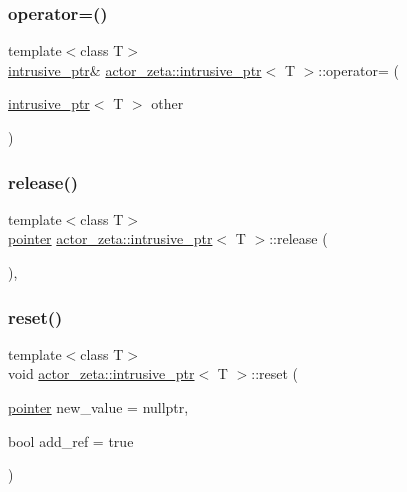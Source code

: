\subsubsection{\texorpdfstring{operator=()}{operator=()}\hspace{0.1cm}{\footnotesize\ttfamily [2/2]}}
{\footnotesize\ttfamily template$<$class T$>$ \\
\hyperlink{classactor__zeta_1_1intrusive__ptr}{intrusive\+\_\+ptr}\& \hyperlink{classactor__zeta_1_1intrusive__ptr}{actor\+\_\+zeta\+::intrusive\+\_\+ptr}$<$ T $>$\+::operator= (\begin{DoxyParamCaption}\item[{\hyperlink{classactor__zeta_1_1intrusive__ptr}{intrusive\+\_\+ptr}$<$ T $>$}]{other }\end{DoxyParamCaption})\hspace{0.3cm}{\ttfamily [inline]}}

\mbox{\label{classactor__zeta_1_1intrusive__ptr_ad9747a7d8669483fc782fc5823b8f096}} 
\subsubsection{\texorpdfstring{release()}{release()}}
{\footnotesize\ttfamily template$<$class T$>$ \\
\hyperlink{classactor__zeta_1_1intrusive__ptr_a149a1cdd3f154db67d7f53a371bfc4e4}{pointer} \hyperlink{classactor__zeta_1_1intrusive__ptr}{actor\+\_\+zeta\+::intrusive\+\_\+ptr}$<$ T $>$\+::release (\begin{DoxyParamCaption}{ }\end{DoxyParamCaption})\hspace{0.3cm}{\ttfamily [inline]}, {\ttfamily [noexcept]}}

\mbox{\label{classactor__zeta_1_1intrusive__ptr_a6931e58e1f64ea410eb72902714e0688}} 
\subsubsection{\texorpdfstring{reset()}{reset()}}
{\footnotesize\ttfamily template$<$class T$>$ \\
void \hyperlink{classactor__zeta_1_1intrusive__ptr}{actor\+\_\+zeta\+::intrusive\+\_\+ptr}$<$ T $>$\+::reset (\begin{DoxyParamCaption}\item[{\hyperlink{classactor__zeta_1_1intrusive__ptr_a149a1cdd3f154db67d7f53a371bfc4e4}{pointer}}]{new\+\_\+value = {\ttfamily nullptr},  }\item[{bool}]{add\+\_\+ref = {\ttfamily true} }\end{DoxyParamCaption})\hspace{0.3cm}{\ttfamily [inline]}}

